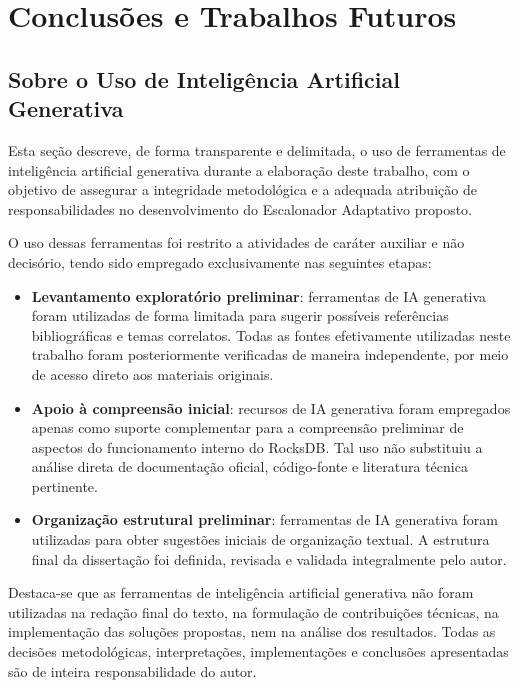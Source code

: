 \chapter{Conclusões e Trabalhos Futuros}\label{cap:conclusao}

\section*{Sobre o Uso de Inteligência Artificial Generativa}

Esta seção descreve, de forma transparente e delimitada, o uso de ferramentas de inteligência artificial generativa durante a elaboração deste trabalho, com o objetivo de assegurar a integridade metodológica e a adequada atribuição de responsabilidades no desenvolvimento do Escalonador Adaptativo proposto.

O uso dessas ferramentas foi restrito a atividades de caráter auxiliar e não decisório, tendo sido empregado exclusivamente nas seguintes etapas:

\begin{itemize}
  \item \textbf{Levantamento exploratório preliminar}: ferramentas de IA generativa foram utilizadas de forma limitada para sugerir possíveis referências bibliográficas e temas correlatos. Todas as fontes efetivamente utilizadas neste trabalho foram posteriormente verificadas de maneira independente, por meio de acesso direto aos materiais originais.
  
  \item \textbf{Apoio à compreensão inicial}: recursos de IA generativa foram empregados apenas como suporte complementar para a compreensão preliminar de aspectos do funcionamento interno do RocksDB. Tal uso não substituiu a análise direta de documentação oficial, código-fonte e literatura técnica pertinente.
  
  \item \textbf{Organização estrutural preliminar}: ferramentas de IA generativa foram utilizadas para obter sugestões iniciais de organização textual. A estrutura final da dissertação foi definida, revisada e validada integralmente pelo autor.
\end{itemize}

Destaca-se que as ferramentas de inteligência artificial generativa não foram utilizadas na redação final do texto, na formulação de contribuições técnicas, na implementação das soluções propostas, nem na análise dos resultados. Todas as decisões metodológicas, interpretações, implementações e conclusões apresentadas são de inteira responsabilidade do autor.

